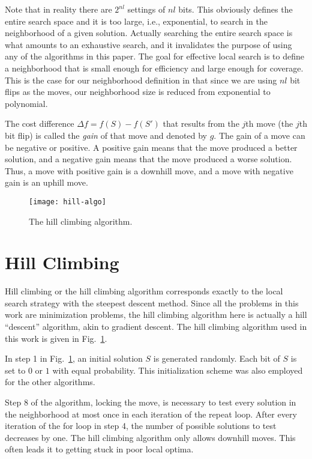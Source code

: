\documentclass{article}
\begin{document}
Note that in reality there are $2^{nl}$ settings of $nl$ bits. This
obviously defines the entire search space and it is too large, i.e.,
exponential, to search in the neighborhood of a given
solution. Actually searching the entire search space is what amounts
to an exhaustive search, and it invalidates the purpose of using any
of the algorithms in this paper. The goal for effective local search
is to define a neighborhood that is small enough for efficiency and
large enough for coverage. This is the case for our neighborhood
definition in that since we are using $nl$ bit flips as the moves, our
neighborhood size is reduced from exponential to polynomial.

The cost difference $\Delta f = f(S)-f(S')$ that results from the
$j$th move (the $j$th bit flip) is called the {\em gain} of that move
and denoted by $g$. The gain of a move can be negative or positive. A
positive gain means that the move produced a better solution, and a
negative gain means that the move produced a worse solution. Thus, a
move with positive gain is a downhill move, and a move with negative
gain is an uphill move.

\begin{figure}[t]
  \centering
  \texttt{[image: hill-algo]}
  \caption{The hill climbing algorithm.}
  \label{fig:hill-algo}
\end{figure}

\section{Hill Climbing}
\label{sec:hill-algo}

Hill climbing or the hill climbing algorithm corresponds exactly to
the local search strategy with the steepest descent method. Since all
the problems in this work are minimization problems, the hill climbing
algorithm here is actually a hill ``descent'' algorithm, akin to
gradient descent. The hill climbing algorithm used in this work is
given in Fig.~\ref{fig:hill-algo}.

In step 1 in Fig.~\ref{fig:hill-algo}, an initial solution $S$ is
generated randomly. Each bit of $S$ is set to $0$ or $1$ with equal
probability. This initialization scheme was also employed for the
other algorithms.

Step 8 of the algorithm, locking the move, is necessary to test every
solution in the neighborhood at most once in each iteration of the
repeat loop. After every iteration of the for loop in step 4, the
number of possible solutions to test decreases by one. The hill
climbing algorithm only allows downhill moves. This often leads it to
getting stuck in poor local optima.
\end{document}
